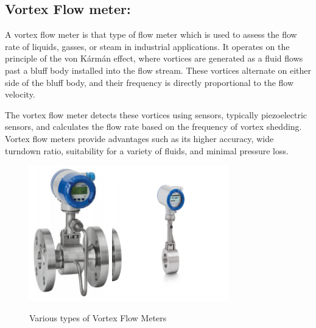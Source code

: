 \subsection{Vortex Flow meter:}

A vortex flow meter is that type of flow meter which is used to assess
the flow rate of liquids, gasses, or steam in industrial applications.
It operates on the principle of the von Kármán effect, where vortices
are generated as a fluid flows past a bluff body installed into the flow
stream. These vortices alternate on either side of the bluff body, and
their frequency is directly proportional to the flow velocity.

The vortex flow meter detects these vortices using sensors, typically
piezoelectric sensors, and calculates the flow rate based on the
frequency of vortex shedding. Vortex flow meters provide advantages such
as its higher accuracy, wide turndown ratio, suitability for a variety
of fluids, and minimal pressure loss.

\begin{figure}[h!]
    \centering
    \includegraphics[width=1.41806in,height=2.31944in]{figs/flowmeters/image7.png}\includegraphics[width=1.99792in,height=2.31944in]{figs/flowmeters/image8.png}
    \caption{Various types of Vortex Flow Meters}
    \label{fig:electric_flowmeters}
\end{figure}

